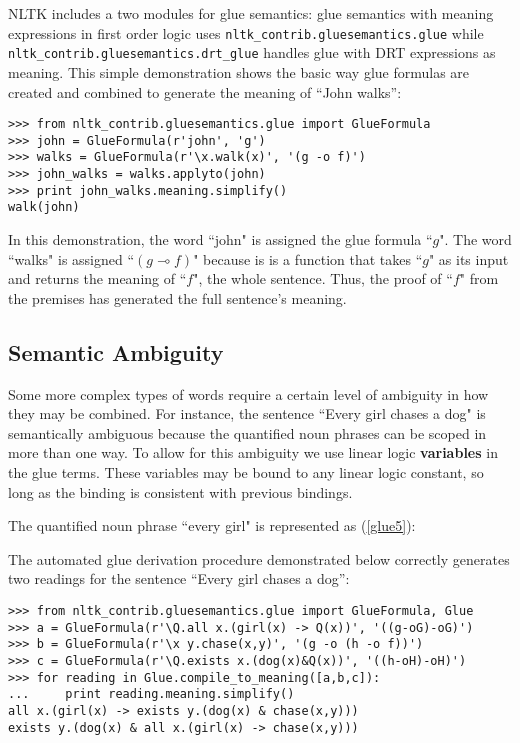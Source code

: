 \documentclass[11pt]{article}
\newcommand{\dhgcode}[1]{{\tt #1}}
\begin{document}
NLTK includes a two modules for glue semantics: glue semantics with meaning expressions in first order logic uses \dhgcode{nltk\_contrib.gluesemantics.glue} while \dhgcode{nltk\_contrib.gluesemantics.drt\_glue} handles glue with DRT expressions as meaning.  This simple demonstration shows the basic way glue formulas are created and combined to generate the meaning of ``John walks'':

\begin{verbatim}
>>> from nltk_contrib.gluesemantics.glue import GlueFormula
>>> john = GlueFormula(r'john', 'g')
>>> walks = GlueFormula(r'\x.walk(x)', '(g -o f)')
>>> john_walks = walks.applyto(john)
>>> print john_walks.meaning.simplify()
walk(john)
\end{verbatim}

In this demonstration, the word ``john" is assigned the glue formula ``$g$".  The word ``walks" is assigned ``$(g \multimap f)$" because is is a function that takes ``$g$" as its input and returns the meaning of ``$f$", the whole sentence.  Thus, the proof of ``$f$" from the premises has generated the full sentence's meaning.

\subsection{Semantic Ambiguity}

Some more complex types of words require a certain level of ambiguity in how they may be combined.  For instance, the sentence ``Every girl chases a dog" is semantically ambiguous because the quantified noun phrases can be scoped in more than one way.  To allow for this ambiguity we use linear logic \textbf{variables} in the glue terms.  These variables may be bound to any linear logic constant, so long as the binding is consistent with previous bindings.

The quantified noun phrase ``every girl" is represented as (\ref{glue5}):


The automated glue derivation procedure demonstrated below correctly generates two readings for the sentence ``Every girl chases a dog'':

\begin{verbatim}
>>> from nltk_contrib.gluesemantics.glue import GlueFormula, Glue
>>> a = GlueFormula(r'\Q.all x.(girl(x) -> Q(x))', '((g-oG)-oG)')
>>> b = GlueFormula(r'\x y.chase(x,y)', '(g -o (h -o f))')
>>> c = GlueFormula(r'\Q.exists x.(dog(x)&Q(x))', '((h-oH)-oH)')
>>> for reading in Glue.compile_to_meaning([a,b,c]):
...     print reading.meaning.simplify()
all x.(girl(x) -> exists y.(dog(x) & chase(x,y)))
exists y.(dog(x) & all x.(girl(x) -> chase(x,y)))
\end{verbatim}
\end{document}
